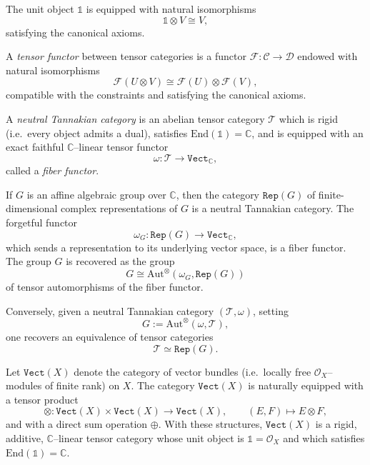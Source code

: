 \documentclass[12pt,reqno]{amsart}
\numberwithin{equation}{subsection}
\theoremstyle{definition}
\theoremstyle{theorem}
\begin{document}
The unit object $\mathbb{1}$ is equipped with natural isomorphisms
\[
\mathbb{1} \otimes V \cong V,
\]
satisfying the canonical axioms.

A \emph{tensor functor} between tensor categories is a functor
$\mathscr{F} : \mathcal{C} \to \mathcal{D}$ endowed with natural isomorphisms
\[
\mathscr{F}(U \otimes V) \cong \mathscr{F}(U) \otimes \mathscr{F}(V),
\]
compatible with the constraints and satisfying the canonical axioms.

A \emph{neutral Tannakian category} is an abelian tensor category $\mathcal{T}$
which is rigid (i.e.\ every object admits a dual), satisfies
$\mathrm{End}(\mathbb{1}) = \mathbb{C}$, and is equipped with an exact faithful
$\mathbb{C}$--linear tensor functor
\[
\omega : \mathcal{T} \longrightarrow \texttt{Vect}_{\mathbb{C}},
\]
called a \emph{fiber functor}.

If $G$ is an affine algebraic group over $\mathbb{C}$, then the category
$\texttt{Rep}(G)$ of finite-dimensional complex representations of $G$ is a
neutral Tannakian category. The forgetful functor
\[
\omega_{G} : \texttt{Rep}(G) \longrightarrow \texttt{Vect}_{\mathbb{C}},
\]
which sends a representation to its underlying vector space, is a fiber
functor. The group $G$ is recovered as the group
\[
G \cong \mathrm{Aut}^{\otimes}(\omega_{G}, \texttt{Rep}(G))
\]
of tensor automorphisms of the fiber functor.

Conversely, given a neutral Tannakian category $(\mathcal{T}, \omega)$, setting
\[
G := \mathrm{Aut}^{\otimes}(\omega, \mathcal{T}),
\]
one recovers an equivalence of tensor categories
\[
\mathcal{T} \simeq \texttt{Rep}(G).
\]


Let $\texttt{Vect}(X)$ denote the category of vector bundles (i.e.\ locally free
$\mathcal{O}_{X}$--modules of finite rank) on $X$. The category
$\texttt{Vect}(X)$ is naturally equipped with a tensor product
\[
\otimes : \texttt{Vect}(X) \times \texttt{Vect}(X) \longrightarrow
\texttt{Vect}(X),
\qquad (E,F) \longmapsto E \otimes F,
\]
and with a direct sum operation $\oplus$. With these structures,
$\texttt{Vect}(X)$ is a rigid, additive, $\mathbb{C}$--linear tensor category
whose unit object is $\mathbb{1}=\mathcal{O}_{X}$ and which satisfies
$\mathrm{End}(\mathbb{1})=\mathbb{C}$.
\end{document}
